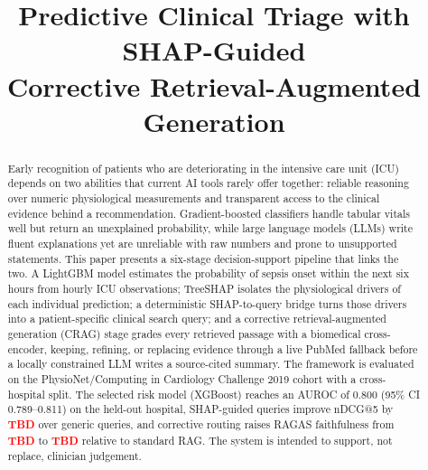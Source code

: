 \documentclass[conference]{IEEEtran}
\newcommand{\tbd}{\textcolor{red}{\textbf{TBD}}}
\begin{document}
\title{Predictive Clinical Triage with SHAP-Guided\\
Corrective Retrieval-Augmented Generation}

\author{
}

\maketitle

\begin{abstract}
Early recognition of patients who are deteriorating in the intensive care
unit (ICU) depends on two abilities that current AI tools rarely offer
together: reliable reasoning over numeric physiological measurements and
transparent access to the clinical evidence behind a recommendation.
Gradient-boosted classifiers handle tabular vitals well but return an
unexplained probability, while large language models (LLMs) write fluent
explanations yet are unreliable with raw numbers and prone to unsupported
statements. This paper presents a six-stage decision-support pipeline that
links the two. A LightGBM model estimates the probability of sepsis onset
within the next six hours from hourly ICU observations; TreeSHAP isolates
the physiological drivers of each individual prediction; a deterministic
SHAP-to-query bridge turns those drivers into a patient-specific clinical
search query; and a corrective retrieval-augmented generation (CRAG) stage
grades every retrieved passage with a biomedical cross-encoder, keeping,
refining, or replacing evidence through a live PubMed fallback before a
locally constrained LLM writes a source-cited summary. The framework is
evaluated on the PhysioNet/Computing in Cardiology Challenge 2019 cohort
with a cross-hospital split. The selected risk model (XGBoost) reaches an
AUROC of 0.800 (95\% CI 0.789--0.811) on the held-out hospital, SHAP-guided queries improve nDCG@5 by
\tbd{} over generic queries, and corrective routing raises RAGAS
faithfulness from \tbd{} to \tbd{} relative to standard RAG. The system is
intended to support, not replace, clinician judgement.
\end{abstract}
\end{document}
